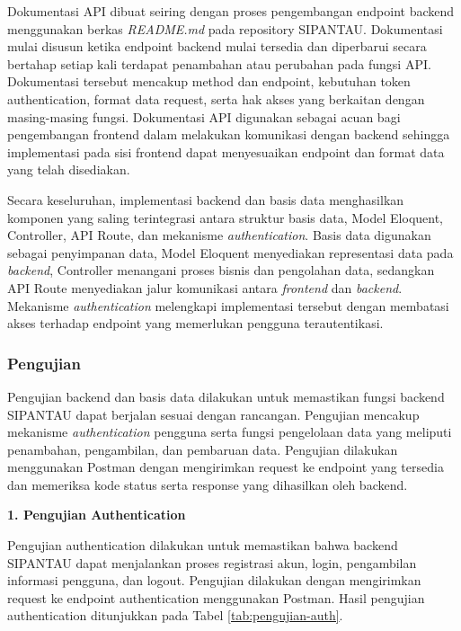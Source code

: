 Dokumentasi API dibuat seiring dengan proses pengembangan endpoint backend menggunakan berkas \textit{README.md} pada repository SIPANTAU. Dokumentasi mulai disusun ketika endpoint backend mulai tersedia dan diperbarui secara bertahap setiap kali terdapat penambahan atau perubahan pada fungsi API. Dokumentasi tersebut mencakup method dan endpoint, kebutuhan token authentication, format data request, serta hak akses yang berkaitan dengan masing-masing fungsi. Dokumentasi API digunakan sebagai acuan bagi pengembangan frontend dalam melakukan komunikasi dengan backend sehingga implementasi pada sisi frontend dapat menyesuaikan endpoint dan format data yang telah disediakan.

Secara keseluruhan, implementasi backend dan basis data menghasilkan komponen yang saling terintegrasi antara struktur basis data, Model Eloquent, Controller, API Route, dan mekanisme \textit{authentication}. Basis data digunakan sebagai penyimpanan data, Model Eloquent menyediakan representasi data pada \textit{backend}, Controller menangani proses bisnis dan pengolahan data, sedangkan API Route menyediakan jalur komunikasi antara \textit{frontend} dan \textit{backend}. Mekanisme \textit{authentication} melengkapi implementasi tersebut dengan membatasi akses terhadap endpoint yang memerlukan pengguna terautentikasi.

\subsubsection{Pengujian}

Pengujian backend dan basis data dilakukan untuk memastikan fungsi backend SIPANTAU dapat berjalan sesuai dengan rancangan. Pengujian mencakup mekanisme \textit{authentication} pengguna serta fungsi pengelolaan data yang meliputi penambahan, pengambilan, dan pembaruan data. Pengujian dilakukan menggunakan Postman dengan mengirimkan request ke endpoint yang tersedia dan memeriksa kode status serta response yang dihasilkan oleh backend.

\vspace{0.5em}
\noindent\textbf{1. Pengujian Authentication}
\vspace{0.5em}

Pengujian authentication dilakukan untuk memastikan bahwa backend SIPANTAU dapat menjalankan proses registrasi akun, login, pengambilan informasi pengguna, dan logout. Pengujian dilakukan dengan mengirimkan request ke endpoint authentication menggunakan Postman. Hasil pengujian authentication ditunjukkan pada Tabel \ref{tab:pengujian-auth}.

